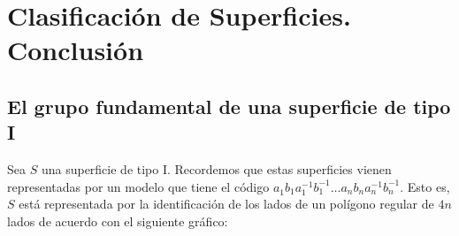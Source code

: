 \documentclass[GTS.tex]{subfiles}
\begin{document}
\renewcommand\chaptername{\Huge Tema}

\titleformat{\chapter}[display]
    {\normalfont\huge\bfseries}{\chaptertitlename\ \thechapter}{10pt}{\Huge}
\titlespacing*{\chapter}{0pt}{-1cm}{10pt}





\setcounter{chapter}{5}

\chapter{Clasificación de Superficies.\\ Conclusión}

\section{El grupo fundamental de una superficie de tipo I}
Sea $S$ una superficie de tipo I. Recordemos que estas superficies vienen representadas por un modelo que tiene el código $a^{}_1b^{}_1a^{-1}_1b^{-1}_1\dots a^{}_nb^{}_na^{-1}_nb^{-1}_n$. Esto es, $S$ está representada por la identificación de los lados de un polígono regular de $4n$ lados de acuerdo con el siguiente gráfico:
\end{document}
